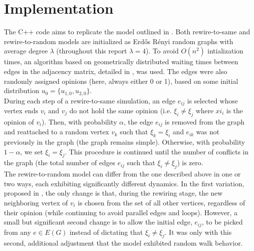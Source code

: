 \documentclass[11pt]{article}
\begin{document}
\section*{Implementation}
The C++ code aims to replicate the model outlined in \cite{durret:pnas12}. Both rewire-to-same and rewire-to-random models are initialized as Erd\H{o}s R\'{e}nyi random graphs with average degree $\lambda$ (throughout this report $\lambda = 4$). To avoid $O(n^{2})$ intialization times, an algorithm based on geometrically distributed waiting times between edges in the adjacency matrix, detailed in \cite{?}, was used. The edges were also randomly assigned opinions (here, always either 0 or 1), based on some initial distribution $u_{0}=\{u_{1,0},u_{2,0}\}$. \\[1pt]
\indent During each step of a rewire-to-same simulation, an edge $e_{ij}$ is selected whose vertex ends $v_{i}$ and $v_{j}$ do not hold the same opinion (i.e. $\xi_{i}\neq\xi_{j}$ where $xi_{i}$ is the opinion of $v_{i}$). Then, with probability $\alpha$, the edge $e_{ij}$ is removed from the graph and reattached to a random vertex $v_{k}$ such that $\xi_{k}=\xi_{i}$ and $e_{ik}$ was not previously in the graph (the graph remains simple). Otherwise, with probability $1-\alpha$, we set $\xi_{i}=\xi_{j}$. This procedure is continued until the number of conflicts in the graph (the total number of edges $e_{ij}$ such that $\xi_{i}\neq\xi_{j}$) is zero. \\[1pt]
\indent The rewire-to-random model can differ from the one described above in one or two ways, each exhibiting significantly different dynamics. In the first variation, proposed in \cite{durret:pnas12}, the only change is that, during the rewiring stage, the new neighboring vertex of $v_{i}$ is chosen from the set of all other vertices, regardless of their opinion (while continuing to avoid parallel edges and loops). However, a small but significant second change is to allow the initial edge, $e_{ij}$, to be picked from any $e\in E(G)$ instead of dictating that $\xi_{i}\neq\xi_{j}$.  It was only with this second, additional adjustment that the model exhibited random walk behavior.
\end{document}
